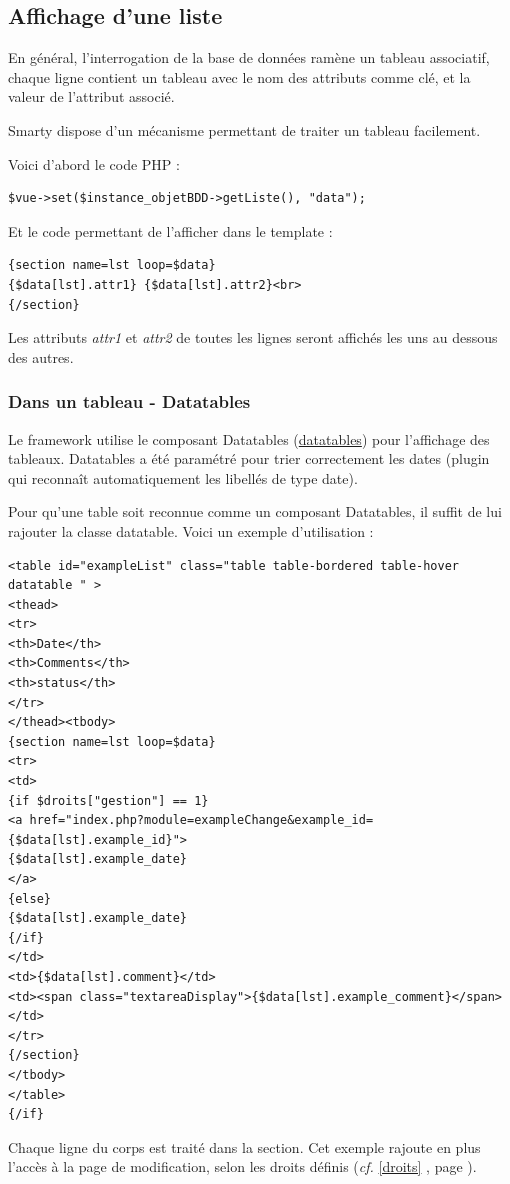 \subsection{Affichage d'une liste}
En général, l'interrogation de la base de données ramène un tableau associatif, chaque ligne contient un tableau avec le nom des attributs comme clé, et la valeur de l'attribut associé.

Smarty dispose d'un mécanisme permettant de traiter un tableau facilement.

Voici d'abord le code PHP :
\begin{lstlisting} 
$vue->set($instance_objetBDD->getListe(), "data");
\end{lstlisting}

Et le code permettant de l'afficher dans le template :
\begin{lstlisting}
{section name=lst loop=$data}
{$data[lst].attr1} {$data[lst].attr2}<br>
{/section}
\end{lstlisting}

Les attributs \textit{attr1} et \textit{attr2} de toutes les lignes seront affichés les uns au dessous des autres.

\subsubsection{Dans un tableau - Datatables}

Le framework utilise le composant Datatables (\url{datatables}) pour l'affichage des tableaux. Datatables a été paramétré pour trier correctement les dates (plugin qui reconnaît automatiquement les libellés de type date).

Pour qu'une table soit reconnue comme un composant Datatables, il suffit de lui rajouter la classe datatable. Voici un exemple d'utilisation :
\begin{lstlisting}
<table id="exampleList" class="table table-bordered table-hover datatable " >
<thead>
<tr>
<th>Date</th>
<th>Comments</th>
<th>status</th>
</tr>
</thead><tbody>
{section name=lst loop=$data}
<tr>
<td>
{if $droits["gestion"] == 1}
<a href="index.php?module=exampleChange&example_id={$data[lst].example_id}">
{$data[lst].example_date}
</a>
{else}
{$data[lst].example_date}
{/if}
</td>
<td>{$data[lst].comment}</td>
<td><span class="textareaDisplay">{$data[lst].example_comment}</span></td>
</tr>
{/section}
</tbody>
</table>
{/if}
\end{lstlisting}

Chaque ligne du corps est traité dans la section. Cet exemple rajoute en plus l'accès à la page de modification, selon les droits définis (\textit{cf.} \ref{droits} \textit{}, page \pageref{droits}).

